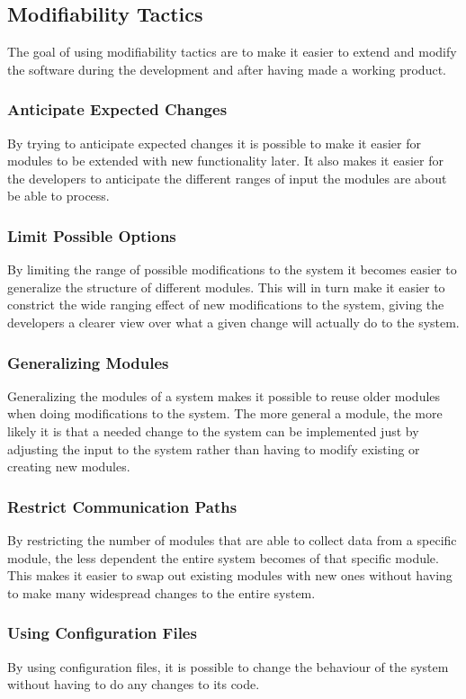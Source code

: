\subsection{Modifiability Tactics}
The goal of using modifiability tactics are to make it easier to extend and modify the software during the development and after having made a working product.

\subsubsection{Anticipate Expected Changes}
By trying to anticipate expected changes it is possible to make it easier for modules to be extended with new functionality later. It also makes it easier for the developers to anticipate the different ranges of input the modules are about be able to process.

\subsubsection{Limit Possible Options}
By limiting the range of possible modifications to the system it becomes easier to generalize the structure of different modules. This will in turn make it easier to constrict the wide ranging effect of new modifications to the system, giving the developers a clearer view over what a given change will actually do to the system.

\subsubsection{Generalizing Modules}
Generalizing the modules of a system makes it possible to reuse older modules when doing modifications to the system. The more general a module, the more likely it is that a needed change to the system can be implemented just by adjusting the input to the system rather than having to modify existing or creating new modules.

\subsubsection{Restrict Communication Paths}
By restricting the number of modules that are able to collect data from a specific module, the less dependent the entire system becomes of that specific module. This makes it easier to swap out existing modules with new ones without having to make many widespread changes to the entire system.

\subsubsection{Using Configuration Files}
By using configuration files, it is possible to change the behaviour of the system without having to do any changes to its code.

